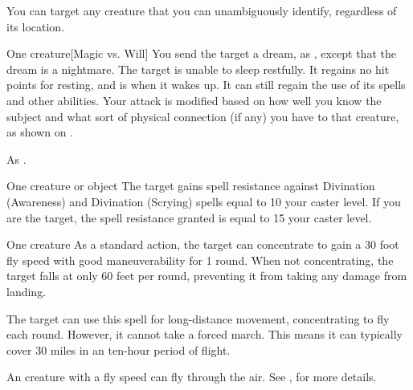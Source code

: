 \spellspecial You can target any creature that you can unambiguously identify, regardless of its location.
\begin{spelltarget}{One creature}[Magic vs. Will]
    \spelleffect You send the target a dream, as , except that the dream is a nightmare.
    \spellsuccess The target is unable to sleep restfully. It regains no hit points for resting, and is \fatigued when it wakes up. It can still regain the use of its spells and other abilities.
    \spellspecial Your attack is modified based on how well you know the subject and what sort of physical connection (if any) you have to that creature, as shown on .
\end{spelltarget}
\spellnotes As .

\spelldur{\durext \dismissable}
\begin{spelltarget}{One creature or object}
    \spelleffect The target gains spell resistance against Divination (Awareness) and Divination (Scrying) spells equal to 10 \add your caster level. If you are the target, the spell resistance granted is equal to 15 \add your caster level.
\end{spelltarget}

\spelldur{\durext}
\begin{spelltarget}{One creature}
    \spelleffect As a standard action, the target can concentrate to gain a 30 foot fly speed with good maneuverability for 1 round. When not concentrating, the target falls at only 60 feet per round, preventing it from taking any damage from landing.

    The target can use this spell for long-distance movement, concentrating to fly each round. However, it cannot take a forced march. This means it can typically cover 30 miles in an ten-hour period of flight.
\end{spelltarget}
\spellnotes An \unencumbered creature with a fly speed can fly through the air. See , for more details.


